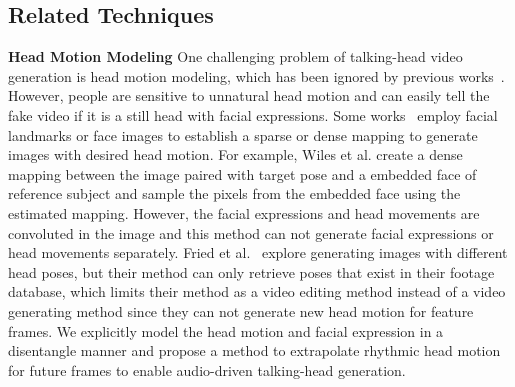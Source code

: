 \documentclass[runningheads]{llncs}
\begin{document}
\subsection{Related Techniques }
\label{subsec:related_tec}
\noindent \textbf{Head Motion Modeling} \quad
One challenging problem of talking-head video generation is head motion modeling, which has been ignored by previous works~\cite{pumarola2019ganimation,vougioukas2019realistic,chung2017you,ijcai2019-129,zhou2019talking}. However, people are sensitive to unnatural head motion and can easily tell the fake video if it is a still head with facial expressions. Some works~\cite{zakharov2019few,wang2018fewshotvid2vid,wiles2018x2face} employ facial landmarks or face images to establish a sparse or dense mapping to generate images with desired head motion. For example, Wiles et al.  create a dense mapping between the image paired with target pose and a embedded face of reference subject and sample the pixels from the embedded face using the estimated mapping. However, the facial expressions and head movements are convoluted in the image and this method can not generate facial expressions or head movements separately. Fried et al.~\cite{Fried19} explore generating images with different head poses, but their method can only retrieve poses that exist in their footage database, which limits their method as a video editing method instead of a video generating method since they can not generate new head motion for feature frames. We explicitly model the head motion and facial expression in a disentangle manner and propose a method to extrapolate rhythmic head motion for future frames to enable audio-driven talking-head generation.  %
\end{document}
